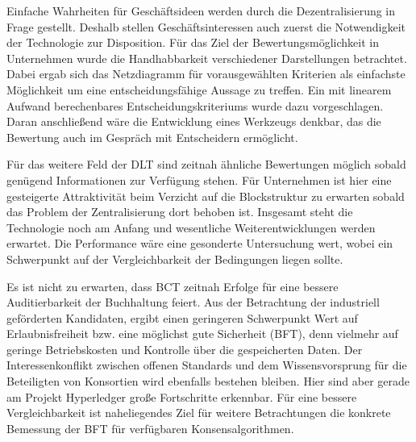 
Einfache Wahrheiten für Geschäftsideen werden durch die Dezentralisierung in Frage gestellt.
Deshalb stellen Geschäftsinteressen auch zuerst die Notwendigkeit der Technologie zur Disposition.
Für das Ziel der Bewertungsmöglichkeit in Unternehmen wurde die Handhabbarkeit verschiedener Darstellungen betrachtet.
Dabei ergab sich das Netzdiagramm für vorausgewählten Kriterien als einfachste Möglichkeit um eine entscheidungsfähige Aussage zu treffen.
Ein mit linearem Aufwand berechenbares Entscheidungskriteriums wurde dazu vorgeschlagen.
Daran anschließend wäre die Entwicklung eines Werkzeugs denkbar, das die Bewertung auch im Gespräch mit Entscheidern ermöglicht.

Für das weitere Feld der \gls{DLT} sind zeitnah ähnliche Bewertungen möglich sobald genügend Informationen zur Verfügung stehen.
Für Unternehmen ist hier eine gesteigerte Attraktivität beim Verzicht auf die Blockstruktur zu erwarten sobald das Problem der Zentralisierung dort behoben ist.
Insgesamt steht die Technologie noch am Anfang und wesentliche Weiterentwicklungen werden erwartet.
Die Performance wäre eine gesonderte Untersuchung wert, wobei ein Schwerpunkt auf der Vergleichbarkeit der Bedingungen liegen sollte.

Es ist nicht zu erwarten, dass \gls{BCT} zeitnah Erfolge für eine bessere Auditierbarkeit der Buchhaltung feiert.
Aus der Betrachtung der industriell geförderten Kandidaten, ergibt einen geringeren Schwerpunkt Wert auf Erlaubnisfreiheit bzw. eine möglichst gute Sicherheit (\gls{BFT}),
denn vielmehr auf geringe Betriebskosten und Kontrolle über die gespeicherten Daten.
Der Interessenkonflikt zwischen offenen Standards und dem Wissensvorsprung für die Beteiligten von Konsortien wird ebenfalls bestehen bleiben.
Hier sind aber gerade am Projekt Hyperledger große Fortschritte erkennbar.
Für eine bessere Vergleichbarkeit ist naheliegendes Ziel für weitere Betrachtungen \ua{} die konkrete Bemessung der \gls{BFT} für verfügbaren Konsensalgorithmen.



